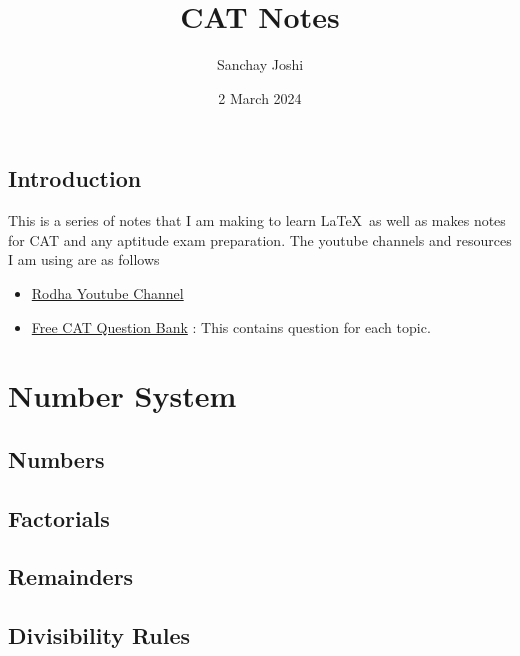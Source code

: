 \documentclass{book}
\title{CAT Notes}
\author{Sanchay Joshi}
\date{2 March 2024}
\begin{document}


\maketitle
\tableofcontents
\newpage



\chapter*{Introduction}
This is a series of notes that I am making to learn \LaTeX \, as well as makes notes for CAT and any aptitude exam preparation. The youtube channels and resources I am using are as follows

\begin{itemize}
    \item \href{https://www.youtube.com/@Rodha/playlists}{Rodha Youtube Channel}
    \item \href{https://iim-cat-questions-answers.2iim.com/}{Free CAT Question Bank} : This contains question for each topic. 
\end{itemize}

\part{Number System}


\chapter{Numbers}


\chapter{Factorials}


\chapter{Remainders}


\chapter{Divisibility Rules}

\end{document}
